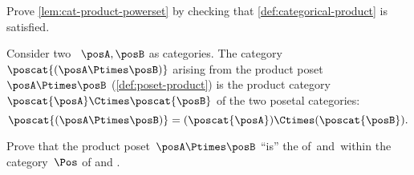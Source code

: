 \vfill
\begin{gradedexercise}
    \label{ex:CatProductPowerset}
    Prove \cref{lem:cat-product-powerset} by checking that \cref{def:categorical-product} is satisfied.
\end{gradedexercise}


\begin{example}
    Consider two ~$\posA,\posB$ as categories.
    The category~$\poscat{(\posA\Ptimes \posB)}$ arising from the product poset~$\posA\Ptimes \posB$ (\cref{def:poset-product}) is the product category~$\poscat{\posA} \Ctimes \poscat{\posB}$ of the two posetal categories:
    \begin{equation}
        \poscat{(\posA\Ptimes \posB)} = (\poscat{\posA}) \Ctimes (\poscat{\posB}).
    \end{equation}
\end{example}

\begin{gradedexercise}
    Prove that the product poset~$\posA \Ptimes \posB$ ``is'' the  of~\posA and~\posB within the category~$\Pos$ of  and .
\end{gradedexercise}

